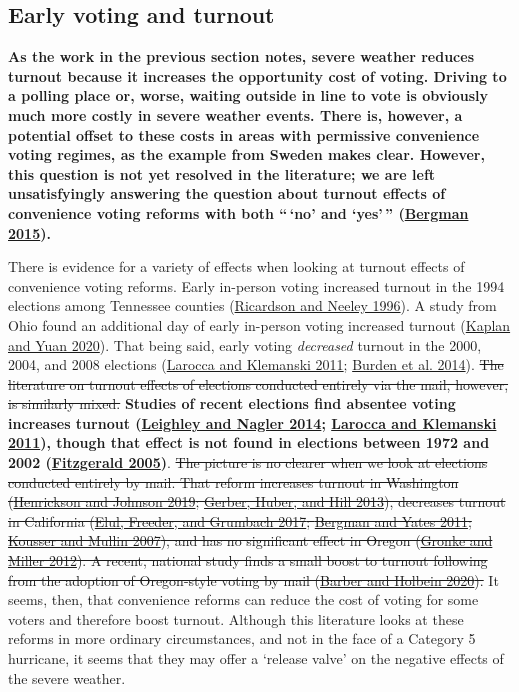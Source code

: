 \documentclass[
  12pt,
]{article}
\begin{document}
\hypertarget{early-voting-and-turnout}{%
\subsection*{Early voting and turnout}\label{early-voting-and-turnout}}

\textbf{As the work in the previous section notes, severe weather reduces turnout because it increases the opportunity cost of voting. Driving to a polling place or, worse, waiting outside in line to vote is obviously much more costly in severe weather events. There is, however, a potential offset to these costs in areas with permissive convenience voting regimes, as the example from Sweden makes clear. However, this question is not yet resolved in the literature; we are left unsatisfyingly answering the question about turnout effects of convenience voting reforms with both ``\,`no' and `yes'\,'' (\protect\hyperlink{ref-Bergman2015}{Bergman 2015}).}

There is evidence for a variety of effects when looking at turnout effects of convenience voting reforms. Early in-person voting increased turnout in the 1994 elections among Tennessee counties (\protect\hyperlink{ref-Ricardson1996}{Ricardson and Neeley 1996}). A study from Ohio found an additional day of early in-person voting increased turnout (\protect\hyperlink{ref-Kaplan2020}{Kaplan and Yuan 2020}). That being said, early voting \emph{decreased} turnout in the 2000, 2004, and 2008 elections (\protect\hyperlink{ref-Larocca2011}{Larocca and Klemanski 2011}; \protect\hyperlink{ref-Burden2014}{Burden et al. 2014}). \sout{The literature on turnout effects of elections conducted entirely via the mail, however, is similarly mixed.} \textbf{Studies of recent elections find absentee voting increases turnout (\protect\hyperlink{ref-Leighley2014}{Leighley and Nagler 2014}; \protect\hyperlink{ref-Larocca2011}{Larocca and Klemanski 2011}), though that effect is not found in elections between 1972 and 2002 (\protect\hyperlink{ref-Fitzgerald2005}{Fitzgerald 2005})}. \sout{The picture is no clearer when we look at elections conducted entirely by mail. That reform increases turnout in Washington (\protect\hyperlink{ref-Henrickson2019}{Henrickson and Johnson 2019}; \protect\hyperlink{ref-Gerber2013}{Gerber, Huber, and Hill 2013}), decreases turnout in California (\protect\hyperlink{ref-Elul2017}{Elul, Freeder, and Grumbach 2017}; \protect\hyperlink{ref-Bergman2011}{Bergman and Yates 2011}; \protect\hyperlink{ref-Kousser2007}{Kousser and Mullin 2007}), and has no significant effect in Oregon (\protect\hyperlink{ref-Gronke2012}{Gronke and Miller 2012}). A recent, national study finds a small boost to turnout following from the adoption of Oregon-style voting by mail (\protect\hyperlink{ref-Barber2020}{Barber and Holbein 2020}).} It seems, then, that convenience reforms can reduce the cost of voting for some voters and therefore boost turnout. Although this literature looks at these reforms in more ordinary circumstances, and not in the face of a Category 5 hurricane, it seems that they may offer a `release valve' on the negative effects of the severe weather.
\end{document}
